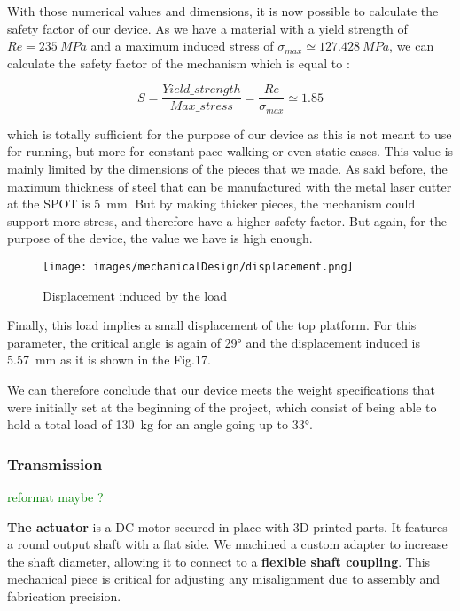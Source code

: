 \documentclass[lettersize,journal]{IEEEtran}
\begin{document}
With those numerical values and dimensions, it is now possible to calculate the safety factor of our device. As we have a material with a yield strength of $Re = \SI{235}{MPa}$ and a maximum induced stress of $\sigma_{max} \simeq \SI{127.428}{MPa}$, we can calculate the safety factor of the mechanism which is equal to :

\begin{equation}
    S = \frac{Yield\_strength}{Max\_stress} = \frac{Re}{\sigma_{max}} \simeq 1.85
\end{equation}

which is totally sufficient for the purpose of our device as this is not meant to use for running, but more for constant pace walking or even static cases. This value is mainly limited by the dimensions of the pieces that we made. As said before, the maximum thickness of steel that can be manufactured with the metal laser cutter at the SPOT is \SI{5}{mm}. But by making thicker pieces, the mechanism could support more stress, and therefore have a higher safety factor. But again, for the purpose of the device, the value we have is high enough.

\begin{figure}[!h]
    \centering
    \texttt{[image: images/mechanicalDesign/displacement.png]}
    \caption{\centering Displacement induced by the load}
    \label{fig:Mechanical_simulation}
\end{figure}

\bigskip

Finally, this load implies a small displacement of the top platform. For this parameter, the critical angle is again of 29° and the displacement induced is \SI{5.57}{mm} as it is shown in the Fig.17. 

\bigskip

We can therefore conclude that our device meets the weight specifications that were initially set at the beginning of the project, which consist of being able to hold a total load of \SI{130}{kg} for an angle going up to 33°.


\bigskip

\newpage
\subsubsection{Transmission } \textcolor{green}{reformat maybe ?}

\textbf{The actuator} is a DC motor secured in place with 3D-printed parts. It features a round output shaft with a flat side. We machined a custom adapter to increase the shaft diameter, allowing it to connect to a \textbf{flexible shaft coupling}. This mechanical piece is critical for adjusting any misalignment due to assembly and fabrication precision.
\end{document}
